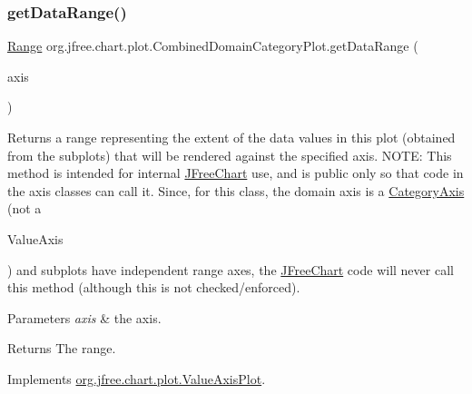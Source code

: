 \subsubsection{\texorpdfstring{get\+Data\+Range()}{getDataRange()}}
{\footnotesize\ttfamily \mbox{\hyperlink{classorg_1_1jfree_1_1data_1_1_range}{Range}} org.\+jfree.\+chart.\+plot.\+Combined\+Domain\+Category\+Plot.\+get\+Data\+Range (\begin{DoxyParamCaption}\item[{\mbox{\hyperlink{classorg_1_1jfree_1_1chart_1_1axis_1_1_value_axis}{Value\+Axis}}}]{axis }\end{DoxyParamCaption})}

Returns a range representing the extent of the data values in this plot (obtained from the subplots) that will be rendered against the specified axis. N\+O\+TE\+: This method is intended for internal \mbox{\hyperlink{classorg_1_1jfree_1_1chart_1_1_j_free_chart}{J\+Free\+Chart}} use, and is public only so that code in the axis classes can call it. Since, for this class, the domain axis is a \mbox{\hyperlink{}{Category\+Axis}} (not a
\begin{DoxyCode}
ValueAxis 
\end{DoxyCode}
 ) and subplots have independent range axes, the \mbox{\hyperlink{classorg_1_1jfree_1_1chart_1_1_j_free_chart}{J\+Free\+Chart}} code will never call this method (although this is not checked/enforced).


\begin{DoxyParams}{Parameters}
{\em axis} & the axis.\\
\hline
\end{DoxyParams}
\begin{DoxyReturn}{Returns}
The range. 
\end{DoxyReturn}


Implements \mbox{\hyperlink{interfaceorg_1_1jfree_1_1chart_1_1plot_1_1_value_axis_plot_a54815b2f078c11b2618804fe3e7e5353}{org.\+jfree.\+chart.\+plot.\+Value\+Axis\+Plot}}.

\mbox{\label{classorg_1_1jfree_1_1chart_1_1plot_1_1_combined_domain_category_plot_a6316f0e91e8db920b189872374719969}} 
